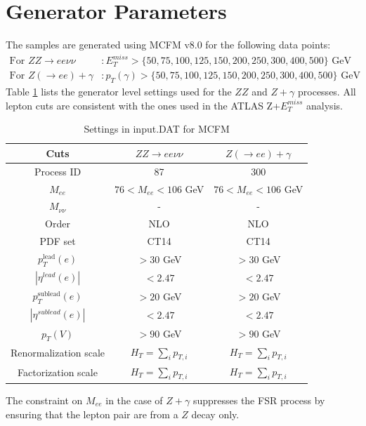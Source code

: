 \documentclass[11pt,a4paper]{report}
\begin{document}
\section{Generator Parameters}
The samples are generated using MCFM v8.0 for the following data points:
\begin{equation}
\begin{split}
	\text{For } ZZ \rightarrow ee\nu\nu &: E_T^{miss} > \{50,75,100,125,150,200,250,300,400,500\}\text{ GeV} \\
	\text{For } Z(\rightarrow ee)+\gamma &: p_T(\gamma) > \{50,75,100,125,150,200,250,300,400,500\}\text{ GeV}
\end{split}
\label{eq:discrete}
\end{equation}
\renewcommand{\thefootnote}{\fnsymbol{footnote}}
Table \ref{table:default} lists the generator level settings used for the $ZZ$ and $Z+\gamma$ processes. All lepton cuts are consistent with the ones used in the ATLAS Z+$E_T^{miss}$ analysis.
\begin{table}[H]
\begin{center}
	\begin{tabular}{|c|c|c|}
	\hline
	\textbf{Cuts} &$ZZ \rightarrow ee\nu\nu$ & $Z(\rightarrow ee)+\gamma$\\
	\hline
	Process ID & 87 & 300\\
	$M_{ee}$ & $76 < M_{ee} < 106$ GeV & $76 < M_{ee} < 106$ GeV\\
	$M_{\nu\nu}$ & - & -\\
	Order & NLO & NLO\\
	PDF set & CT14 & CT14\\
	$p_T^{\text{lead}}(e)$ & $> 30$ GeV & $> 30$ GeV\\
	$|\eta^{lead}(e)|$ & $< 2.47$ & $< 2.47$\\
	$p_T^{\text{sublead}}(e)$ & $> 20$ GeV & $> 20$ GeV\\
	$|\eta^{sublead}(e)|$ & $< 2.47$ & $< 2.47$\\
	$p_T(V)$\footnotemark & $> 90$ GeV & $> 90$ GeV\\
	Renormalization scale & $H_T = \sum_i p_{T,i}$& $H_T = \sum_i p_{T,i}$\\
	Factorization scale & $H_T = \sum_i p_{T,i}$& $H_T = \sum_i p_{T,i}$\\
	\hline
	\end{tabular}
	\caption{Settings in input.DAT for MCFM}
	\label{table:default}
	\end{center}
\end{table}
\renewcommand{\thefootnote}{\arabic{footnote}}
The constraint on $M_{ee}$ in the case of $Z+\gamma$ suppresses the FSR process by ensuring that the lepton pair are from a $Z$ decay only.
\newpage
\end{document}
